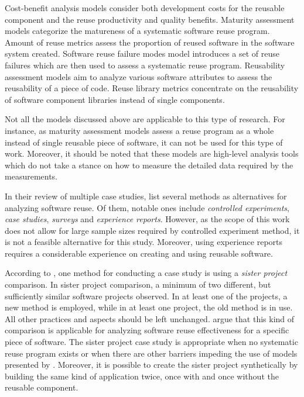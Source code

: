 Cost-benefit analysis models consider both development costs for the reusable component and the reuse productivity and quality benefits. Maturity assessment models categorize the matureness of a systematic software reuse program. Amount of reuse metrics assess the proportion of reused software in the software system created. Software reuse failure modes model introduces a set of reuse failures which are then used to assess a systematic reuse program. Reusability assessment models aim to analyze various software attributes to assess the reusability of a piece of code. Reuse library metrics concentrate on the reusability of software component libraries instead of single components.

Not all the models discussed above are applicable to this type of research. For instance, as maturity assessment models assess a reuse program as a whole instead of single reusable piece of software, it can not be used for this type of work. Moreover, it should be noted that these models are high-level analysis tools which do not take a stance on how to measure the detailed data required by the measurements.

In their review of multiple case studies, \citet{mohagheghi_quality_2007} list several methods as alternatives for analyzing software reuse. Of them, notable ones include \emph{controlled experiments}, \emph{case studies}, \emph{surveys} and \emph{experience reports}. However, as the scope of this work does not allow for large sample sizes required by controlled experiment method, it is not a feasible alternative for this study. Moreover, using experience reports requires a considerable experience on creating and using reusable software.

According to \citet{kitchenham_evaluating_1998}, one method for conducting a case study is using a \emph{sister project} comparison. In sister project comparison, a minimum of two different, but sufficiently similar software projects observed. In at least one of the projects, a new method is employed, while in at least one project, the old method is in use. All other practices and aspects should be left unchanged. \citet{mohagheghi_quality_2007} argue that this kind of comparison is applicable for analyzing software reuse effectiveness for a specific piece of software. The sister project case study is appropriate when no systematic reuse program exists or when there are other barriers impeding the use of models presented by \citet{frakes_software_1996}. Moreover, it is possible to create the sister project synthetically by building the same kind of application twice, once with and once without the reusable component.

